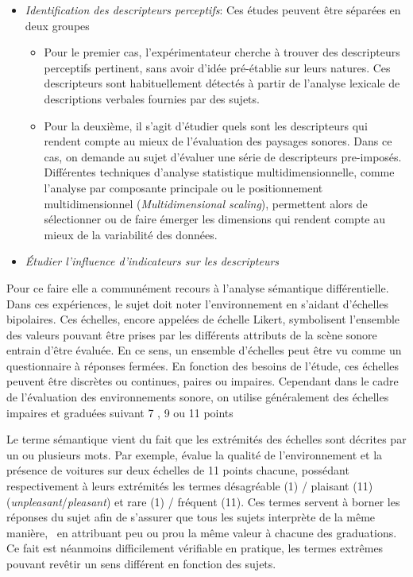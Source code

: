 \begin{itemize}

\item \emph{Identification des descripteurs perceptifs}: Ces études peuvent être séparées en deux groupes
\begin{itemize}
\item Pour le premier cas, l'expérimentateur cherche à trouver des descripteurs perceptifs pertinent, sans avoir d'idée pré-établie sur leurs natures. Ces descripteurs sont habituellement détectés à partir  de l'analyse lexicale de descriptions verbales fournies par des sujets.
\item Pour la deuxième, il s'agit d'étudier quels sont les descripteurs qui rendent compte au mieux de l'évaluation des paysages sonores. Dans ce cas, on demande au sujet d'évaluer une série de descripteurs pre-imposés. Différentes techniques d'analyse statistique multidimensionnelle, comme l'analyse par composante principale ou le positionnement multidimensionnel (\emph{Multidimensional scaling}), permettent alors de sélectionner ou de faire émerger les dimensions qui rendent compte au mieux de la variabilité des données.
\end{itemize}

\item \emph{Étudier l'influence d'indicateurs sur les descripteurs}

\end{itemize}

Pour ce faire elle a communément recours à l'analyse sémantique différentielle. Dans ces expériences, le sujet doit noter l'environnement en s'aidant d'échelles bipolaires. Ces échelles, encore appelées de échelle Likert, symbolisent l'ensemble des valeurs pouvant être prises par les différents attributs de la scène sonore entrain d'être évaluée. En ce sens, un ensemble d'échelles peut être vu comme un questionnaire à réponses fermées. En fonction des besoins de l'étude, ces échelles peuvent être discrètes ou continues, paires ou impaires. Cependant dans le cadre de l'évaluation des environnements sonore, on utilise généralement des échelles impaires et graduées suivant 7 \citep{raimbault2006qualitative}, 9 \citep{hall2013exploratory} ou 11 points \citep{ricciardi2015sound}

Le terme sémantique vient du fait que les extrémités des échelles sont décrites par un ou plusieurs mots. Par exemple, \citep{ricciardi2015sound} évalue la qualité de l'environnement et la présence de voitures sur deux échelles de 11 points chacune, possédant respectivement à leurs extrémités les termes désagréable (1) / plaisant (11) (\emph{unpleasant}/\emph{pleasant}) et rare (1) / fréquent (11). Ces termes servent à borner les réponses du sujet afin de s'assurer que tous les sujets interprète de la même manière, \ie~en attribuant  peu ou prou la même valeur à chacune des graduations. Ce fait est néanmoins difficilement vérifiable en pratique, les termes extrêmes pouvant revêtir un sens différent en fonction des sujets.

